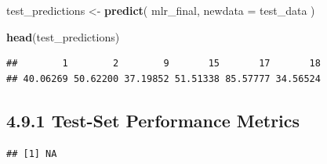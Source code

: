\documentclass[
]{article}
\newenvironment{Shaded}{\begin{snugshade}}{\end{snugshade}}
\newcommand{\AttributeTok}[1]{\textcolor[rgb]{0.13,0.29,0.53}{#1}}
\newcommand{\DecValTok}[1]{\textcolor[rgb]{0.00,0.00,0.81}{#1}}
\newcommand{\FunctionTok}[1]{\textcolor[rgb]{0.13,0.29,0.53}{\textbf{#1}}}
\newcommand{\NormalTok}[1]{#1}
\newcommand{\OtherTok}[1]{\textcolor[rgb]{0.56,0.35,0.01}{#1}}
\newcommand{\SpecialCharTok}[1]{\textcolor[rgb]{0.81,0.36,0.00}{\textbf{#1}}}
\begin{document}
\begin{Shaded}
\begin{Highlighting}[]
\NormalTok{test\_predictions }\OtherTok{\textless{}{-}} \FunctionTok{predict}\NormalTok{(}
\NormalTok{  mlr\_final,}
  \AttributeTok{newdata =}\NormalTok{ test\_data}
\NormalTok{)}

\FunctionTok{head}\NormalTok{(test\_predictions)}
\end{Highlighting}
\end{Shaded}

\begin{verbatim}
##        1        2        9       15       17       18 
## 40.06269 50.62200 37.19852 51.51338 85.57777 34.56524
\end{verbatim}

\subsection{4.9.1 Test-Set Performance
Metrics}\label{test-set-performance-metrics}

\begin{Shaded}
\end{Shaded}

\begin{verbatim}
## [1] NA
\end{verbatim}
\end{document}
